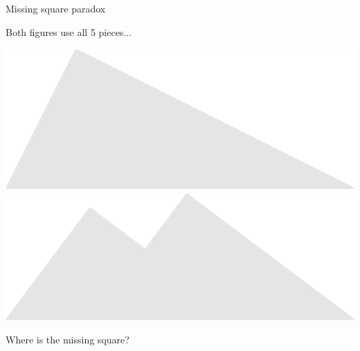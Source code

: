 \documentclass[14pt]{beamer}
\begin{document}

    \begin{frame}{Missing square paradox}
        \begin{center}
            Both figures use all 5 pieces...

            \vspace{50pt}

            \includegraphics[scale=0.45]{figures/figure029l.pdf}\!\!\!
            \includegraphics[scale=0.45]{figures/figure026v.pdf}\;\;

            \vspace{32pt}

            Where is the missing square?
        \end{center}
    \end{frame}
\end{document}
